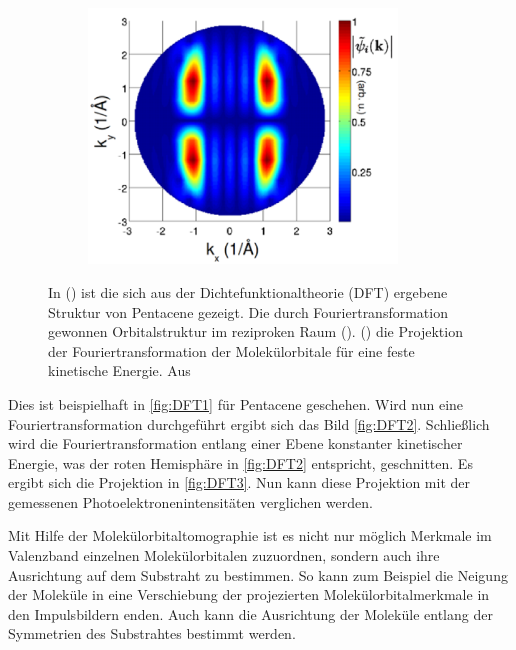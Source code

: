 \begin{figure}
\begin{subfigure}{0.3\textwidth}
                \caption{}
                \label{fig:DFT2}
            \end{subfigure}
            \begin{subfigure}{0.3\textwidth}
                \centering
                \includegraphics[width=0.9\textwidth]{DFT3.PNG}
                \caption{}
                \label{fig:DFT3}
            \end{subfigure}
            \caption{In () ist die sich aus der Dichtefunktionaltheorie (DFT) ergebene Struktur von Pentacene gezeigt.
            Die durch Fouriertransformation gewonnen Orbitalstruktur im reziproken Raum ().
            () die Projektion der Fouriertransformation der Molekülorbitale für eine feste kinetische Energie.
            Aus~\cite{MM_2}}
            \label{fig:DFT}
        \end{figure}
        Dies ist beispielhaft in \autoref{fig:DFT1} für Pentacene geschehen.
        Wird nun eine Fouriertransformation durchgeführt ergibt sich das Bild \autoref{fig:DFT2}.
        Schließlich wird die Fouriertransformation entlang einer Ebene konstanter kinetischer Energie, was der roten Hemisphäre in \autoref{fig:DFT2} entspricht, geschnitten.
        Es ergibt sich die Projektion in \autoref{fig:DFT3}.
        Nun kann diese Projektion mit der gemessenen Photoelektronenintensitäten verglichen werden.

        Mit Hilfe der Molekülorbitaltomographie ist es nicht nur möglich Merkmale im Valenzband einzelnen Molekülorbitalen zuzuordnen, sondern auch ihre Ausrichtung auf dem Substraht zu bestimmen.
        So kann zum Beispiel die Neigung der Moleküle in eine Verschiebung der projezierten Molekülorbitalmerkmale in den Impulsbildern enden.
        Auch kann die Ausrichtung der Moleküle entlang der Symmetrien des Substrahtes bestimmt werden.

